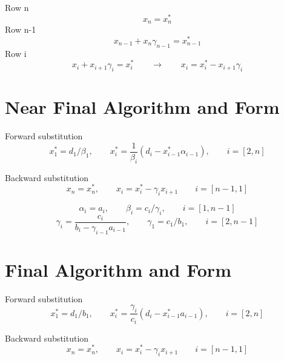 \documentclass[landscape]{article}
\begin{document}
Row n
\begin{equation}
  x_n = x_n^*
\end{equation}
Row n-1
\begin{equation}
  x_{n-1} + x_n \gamma_{n-1} = x_{n-1}^*
\end{equation}
Row i
\begin{equation}
  x_i + x_{i+1} \gamma_{i} = x_{i}^*
  \qquad \rightarrow \qquad
  x_i = x_i^* - x_{i+1} \gamma_i
\end{equation}




\section{Near Final Algorithm and Form}
Forward substitution
\begin{equation}
  x_1^* = d_1 / \beta_1
  ,\qquad
  x_i^*
  =
  \frac{1}{\beta_i} (d_i - x_{i-1}^* \alpha_{i-1})
  ,\qquad
  i=[2,n]
\end{equation}

Backward substitution
\begin{equation}
  x_n = x^*_n
  ,\qquad
  x_{i} = x^*_{i} - \gamma_{i} x_{i+1}
  \qquad
  i = [n-1,1]
\end{equation}

\begin{equation}
  \alpha_i = a_i
  ,\qquad
  \beta_i = c_i/\gamma_i
  ,\qquad
  i = [1,n-1]
\end{equation}
\begin{equation}
  \gamma_i
  =
  \frac{c_i}{b_i - \gamma_{i-1} a_{i-1}}
  ,\qquad
  \gamma_1 = c_1/b_1
  ,\qquad
  i = [2,n-1]
\end{equation}

\section{Final Algorithm and Form}
Forward substitution
\begin{equation}
  x_1^* = d_1 / b_1
  ,\qquad
  x_i^*
  =
  \frac{\gamma_i}{c_i} (d_i - x_{i-1}^* a_{i-1})
  ,\qquad
  i=[2,n]
\end{equation}

Backward substitution
\begin{equation}
  x_n = x^*_n
  ,\qquad
  x_{i} = x^*_{i} - \gamma_{i} x_{i+1}
  \qquad
  i = [n-1,1]
\end{equation}
\end{document}
